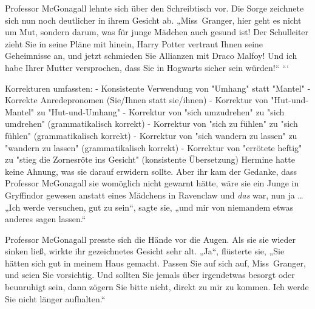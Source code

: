 Professor McGonagall lehnte sich über den Schreibtisch vor. Die Sorge zeichnete sich nun noch deutlicher in ihrem Gesicht ab.
„Miss~Granger, hier geht es nicht um Mut, sondern darum, was für junge Mädchen auch gesund ist! Der Schulleiter zieht Sie in seine Pläne mit hinein, Harry Potter vertraut Ihnen seine Geheimnisse an, und jetzt schmieden Sie Allianzen mit Draco Malfoy! Und ich habe Ihrer Mutter versprochen, dass Sie in Hogwarts sicher sein würden!“
```

Korrekturen umfassten:
- Konsistente Verwendung von "Umhang" statt "Mantel"
- Korrekte Anredepronomen (Sie/Ihnen statt sie/ihnen)
- Korrektur von "Hut-und-Mantel" zu "Hut-und-Umhang"
- Korrektur von "sich umzudrehen" zu "sich umdrehen" (grammatikalisch korrekt)
- Korrektur von "sich zu fühlen" zu "sich fühlen" (grammatikalisch korrekt)
- Korrektur von "sich wandern zu lassen" zu "wandern zu lassen" (grammatikalisch korrekt)
- Korrektur von "errötete heftig" zu "stieg die Zornesröte ins Gesicht" (konsistente Übersetzung)
Hermine hatte keine Ahnung, was sie darauf erwidern sollte. Aber ihr kam der Gedanke, dass Professor McGonagall sie womöglich nicht gewarnt hätte, wäre sie ein Junge in Gryffindor gewesen anstatt eines Mädchens in Ravenclaw und \emph{das} war, nun ja …
„Ich werde versuchen, gut zu sein“, sagte sie, „und mir von niemandem etwas anderes sagen lassen.“

Professor McGonagall presste sich die Hände vor die Augen. Als sie sie wieder sinken ließ, wirkte ihr gezeichnetes Gesicht sehr alt.
„Ja“, flüsterte sie,
„Sie hätten sich gut in meinem Haus gemacht. Passen Sie auf sich auf, Miss~Granger, und seien Sie vorsichtig. Und sollten Sie jemals über irgendetwas besorgt oder beunruhigt sein, dann zögern Sie bitte nicht, direkt zu mir zu kommen. Ich werde Sie nicht länger aufhalten.“

